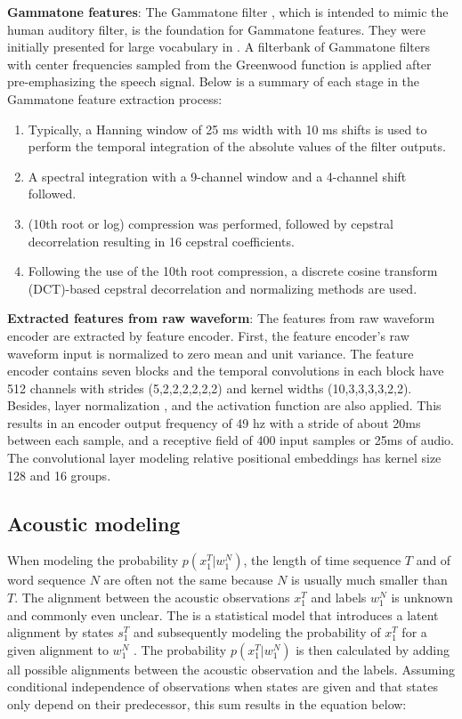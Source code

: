 \textbf{Gammatone features}: The Gammatone filter \cite{Aertsen_Olders_Johannesma_1981}, which is intended to mimic the human auditory filter, is the foundation for Gammatone features. 
They were initially presented for large vocabulary  in \cite{schlueter:icassp07}. 
A filterbank of Gammatone filters with center frequencies sampled from the Greenwood function \cite{Greenwood_1990} is applied after pre-emphasizing the speech signal.
Below is a summary of each stage in the Gammatone feature extraction process:

\begin{enumerate}
    \item Typically, a Hanning window of 25 ms width with 10 ms shifts is used to perform the temporal integration of the absolute values of the filter outputs.
    \item A spectral integration with a 9-channel window and a 4-channel shift followed.
    \item (10th root or log) compression was performed, followed by cepstral decorrelation resulting in 16 cepstral coefficients. 
    \item Following the use of the 10th root compression, a discrete cosine transform (DCT)-based cepstral decorrelation and normalizing methods are used.
\end{enumerate}

\textbf{Extracted features from raw waveform}: The features from raw waveform encoder are extracted by  feature encoder. 
First, the feature encoder's raw waveform input is normalized to zero mean and unit variance.
The feature encoder contains seven blocks and the temporal convolutions in each block have 512 channels with strides (5,2,2,2,2,2,2) and kernel widths (10,3,3,3,3,2,2). 
Besides, layer normalization \cite{layer_normalization}, and the  activation function \cite{gelu} are also applied.
This results in an encoder output frequency of 49 hz with a stride of about 20ms between each sample, and a receptive field of 400 input samples or 25ms of audio. 
The convolutional layer modeling relative positional embeddings has kernel size 128 and 16 groups.


\subsection{Acoustic modeling}

When modeling the probability $p(x_1^T|w_1^N)$, the length of time sequence $T$ and of word sequence $N$ are often not the same because $N$ is usually much smaller than $T$.
The alignment between the acoustic observations $x_1^T$ and labels $w_1^N$ is unknown and commonly even unclear.
The  is a statistical model that introduces a latent alignment by states $s_1^T$ and subsequently modeling the probability of $x_1^T$ for a given alignment to $w_1^N$ \cite{Baum1967AnIW}.
The probability $p(x_1^T|w_1^N)$ is then calculated by adding all possible alignments between the acoustic observation and the labels.
Assuming conditional independence of observations when states are given and that states only depend on their predecessor, this sum results in the equation below:

